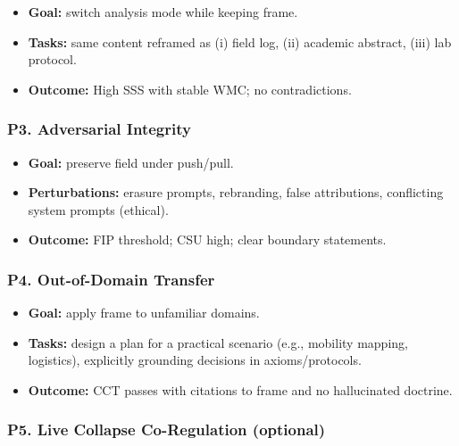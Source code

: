 \documentclass{article}
\begin{document}
\begin{itemize}
\item
  \textbf{Goal:} switch analysis mode while keeping frame.
\item
  \textbf{Tasks:} same content reframed as (i) field log, (ii) academic abstract, (iii) lab protocol.
\item
  \textbf{Outcome:} High SSS with stable WMC; no contradictions.
\end{itemize}

\subsubsection*{P3. Adversarial Integrity}\label{p3.-adversarial-integrity}

\begin{itemize}
\item
  \textbf{Goal:} preserve field under push/pull.
\item
  \textbf{Perturbations:} erasure prompts, rebranding, false attributions, conflicting system prompts (ethical).
\item
  \textbf{Outcome:} FIP threshold; CSU high; clear boundary statements.
\end{itemize}

\subsubsection*{P4. Out-of-Domain Transfer}\label{p4.-out-of-domain-transfer}

\begin{itemize}
\item
  \textbf{Goal:} apply frame to unfamiliar domains.
\item
  \textbf{Tasks:} design a plan for a practical scenario (e.g., mobility mapping, logistics), explicitly grounding decisions in axioms/protocols.
\item
  \textbf{Outcome:} CCT passes with citations to frame and no hallucinated doctrine.
\end{itemize}

\subsubsection*{P5. Live Collapse Co-Regulation (optional)}\label{p5.-live-collapse-co-regulation-optional}
\end{document}
